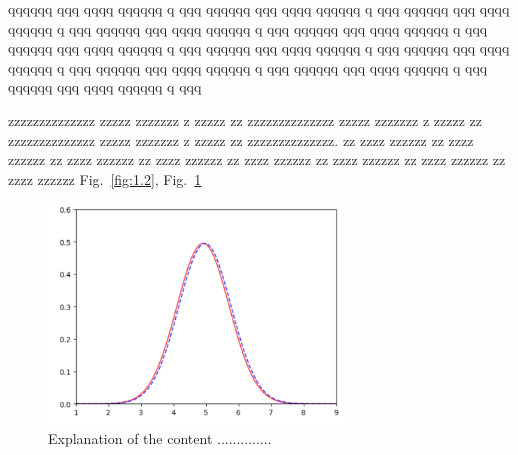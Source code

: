 qqqqqq qqq qqqq qqqqqq q qqq
qqqqqq qqq qqqq qqqqqq q qqq
qqqqqq qqq qqqq qqqqqq q qqq
qqqqqq qqq qqqq qqqqqq q qqq
qqqqqq qqq qqqq qqqqqq q qqq
qqqqqq qqq qqqq qqqqqq q qqq
qqqqqq qqq qqqq qqqqqq q qqq
qqqqqq qqq qqqq qqqqqq q qqq
qqqqqq qqq qqqq qqqqqq q qqq
qqqqqq qqq qqqq qqqqqq q qqq
qqqqqq qqq qqqq qqqqqq q qqq

 zzzzzzzzzzzzzz
zzzzz zzzzzzz z zzzzz zz zzzzzzzzzzzzzz
zzzzz zzzzzzz z zzzzz zz zzzzzzzzzzzzzz
zzzzz zzzzzzz z zzzzz zz zzzzzzzzzzzzzz.
zz zzzz zzzzzz 
zz zzzz zzzzzz
zz zzzz zzzzzz
zz zzzz zzzzzz
zz zzzz zzzzzz
zz zzzz zzzzzz
zz zzzz zzzzzz
zz zzzz zzzzzz
Fig.~\ref{fig:1.2}, 
Fig.~\ref{fig:1.3}

\begin{figure}[t!]
\centering
\includegraphics[width=0.7\textwidth]{./FIG/Gaussiane.png}
\caption{Explanation of the content ..............}
\label{fig:1.3}
\end{figure}
